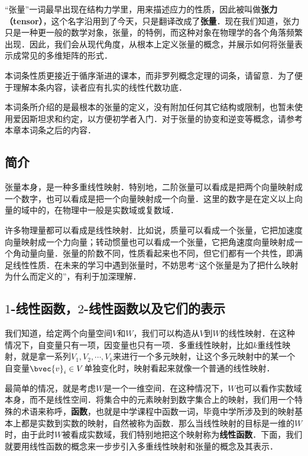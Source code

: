 


“张量”一词最早出现在结构力学里，用来描述应力的性质，因此被叫做\textbf{张力（tensor）}，这个名字沿用到了今天，只是翻译改成了\textbf{张量}．现在我们知道，张力只是一种更一般的数学对象，张量，的特例，而这种对象在物理学的各个角落频繁出现．因此，我们会从现代角度，从根本上定义张量的概念，并展示如何将张量表示成常见的多维矩阵的形式．

本词条性质更接近于循序渐进的课本，而非罗列概念定理的词条，请留意．为了便于理解本条内容，读者应有扎实的线性代数功底．

本词条所介绍的是最根本的张量的定义，没有附加任何其它结构或限制，也暂未使用爱因斯坦求和约定，以方便初学者入门．对于张量的协变和逆变等概念，请参考本章本词条之后的内容．



\subsection{简介}

张量本身，是一种多重线性映射．特别地，二阶张量可以看成是把两个向量映射成一个数字，也可以看成是把一个向量映射成一个向量．这里的数字是在定义以上向量的域中的，在物理中一般是实数域或复数域．

许多物理量都可以看成是线性映射．比如说，质量可以看成一个张量，它把加速度向量映射成一个力向量；转动惯量也可以看成一个张量，它把角速度向量映射成一个角动量向量．张量的阶数不同，性质看起来也不同，但它们都有一个共性，即满足线性性质．在未来的学习中遇到张量时，不妨思考“这个张量是为了把什么映射为什么而定义的”，有利于加深理解．

\subsection{$1$-线性函数，$2$-线性函数以及它们的表示}

我们知道，给定两个向量空间$V$和$W$，我们可以构造从$V$到$W$的线性映射．在这种情况下，自变量只有一项，因变量也只有一项．多重线性映射，比如$k$重线性映射，就是拿一系列$V_1, V_2, \cdots, V_k$来进行一个多元映射，让这个多元映射中的某一个自变量$\bvec{v}_i\in V$单独变化时，映射看起来就像一个普通的线性映射．

最简单的情况，就是考虑$W$是一个一维空间．在这种情况下，$W$也可以看作实数域本身，而不是线性空间．将集合中的元素映射到数字集合上的映射，我们用一个特殊的术语来称呼，\textbf{函数}，也就是中学课程中函数一词，毕竟中学所涉及到的映射基本上都是实数到实数的映射，自然被称为函数．那么当线性映射的目标是一维的$W$时，由于此时$W$被看成实数域，我们特别地把这个映射称为\textbf{线性函数}．下面，我们就要用线性函数的概念来一步步引入多重线性映射和张量的概念及其表示．

